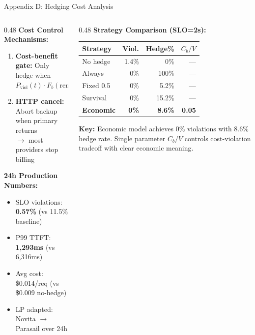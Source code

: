 \documentclass[aspectratio=169,10pt]{beamer}
\begin{document}
\begin{frame}[noframenumbering]
\hypertarget{app:q2}{}{Appendix D: Hedging Cost Analysis}
\begin{columns}[T]
\begin{column}{0.48\textwidth}
\textbf{Cost Control Mechanisms:}
\begin{enumerate}\setlength{\itemsep}{3pt}
    \item \textbf{Cost-benefit gate:} Only hedge when\\
    $P_\text{viol}(t) \cdot F_b(\text{remaining}) > C_b/V$
    \item \textbf{HTTP cancel:} Abort backup when primary returns\\
    $\to$ most providers stop billing
\end{enumerate}

\vspace{0.2cm}
\textbf{24h Production Numbers:}
\begin{itemize}\setlength{\itemsep}{2pt}
    \item SLO violations: \textbf{0.57\%} (vs 11.5\% baseline)
    \item P99 TTFT: \textbf{1,293ms} (vs 6,316ms)
    \item Avg cost: \$0.014/req (vs \$0.009 no-hedge)
    \item LP adapted: Novita $\to$ Parasail over 24h
\end{itemize}
\end{column}

\begin{column}{0.48\textwidth}
\textbf{Strategy Comparison (SLO=2s):}

\vspace{0.1cm}
\footnotesize
\begin{tabular}{lrrr}
\toprule
Strategy & Viol. & Hedge\% & $C_b/V$ \\
\midrule
No hedge & 1.4\% & 0\% & --- \\
Always & 0\% & 100\% & --- \\
Fixed 0.5 & 0\% & 5.2\% & --- \\
Survival & 0\% & 15.2\% & --- \\
\textbf{Economic} & \textbf{0\%} & \textbf{8.6\%} & \textbf{0.05} \\
\bottomrule
\end{tabular}

\vspace{0.2cm}
\normalsize
\textbf{Key:} Economic model achieves 0\% violations with 8.6\% hedge rate. Single parameter $C_b/V$ controls cost-violation tradeoff with clear economic meaning.
\end{column}
\end{columns}
\end{frame}
\end{document}
